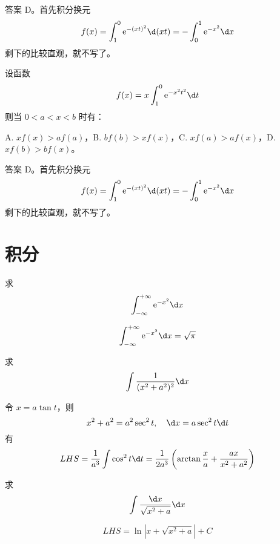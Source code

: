 \begin{solution}
	答案 D。首先积分换元
	\[ f(x) = \int_{1}^{0} \ee^{-(xt)^2} \d (xt) = -\int_{0}^{1} \ee^{-x^2} \d x  \]
	剩下的比较直观，就不写了。
\end{solution}

\begin{problem}[000022]
设函数
\[ f(x) = x \int_{1}^{0} \ee^{-x^2t^2} \d t \]
则当 $0<a<x<b$ 时有：

A. $xf(x) > af(a)$，B. $bf(b) > x f(x)$，C. $xf(a) > af(x)$，D. $xf(b) > bf(x)$。
\end{problem}

\begin{solution}
	答案 D。首先积分换元
	\[ f(x) = \int_{1}^{0} \ee^{-(xt)^2} \d (xt) = -\int_{0}^{1} \ee^{-x^2} \d x  \]
	剩下的比较直观，就不写了。
\end{solution}

\section{积分}

\begin{problem}[000008]
求
\[ \int_{-\infty}^{+\infty} \ee^{-x^2}\d x \]
\end{problem}
\begin{solution}
	\[ \int_{-\infty}^{+\infty} \ee^{-x^2}\d x = \sqrt{\pi} \]
\end{solution}

\begin{problem}[000014]
求
\[ \int \frac{1}{(x^2+a^2)^2} \d x \]
\end{problem}
\begin{solution}
	令 $x = a \tan t$，则
	\[ x^2 + a^2 = a^2 \sec^2 t, \quad \d x = a \sec^2 t \d t \]
	有
	\[ LHS =  \frac{1}{a^3}\int \cos^2 t \d t = \frac{1}{2a^3} \left( \arctan \frac{x}{a} + \frac{ax}{x^2+a^2} \right) \]
\end{solution}


\begin{problem}[000015]
求
\[ \int \frac{\d x}{\sqrt{x^2 + a}} \d x \]
\end{problem}
\begin{solution}
	\[ LHS =  \ln |x + \sqrt{x^2+a}| + C \]
\end{solution}
